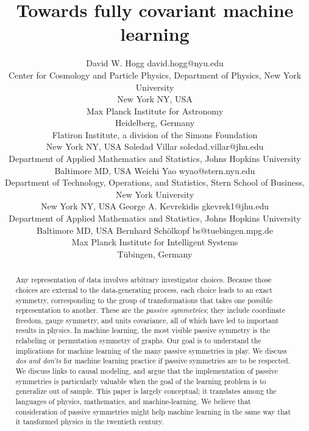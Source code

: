 \documentclass[preprint]{article} %
\title{Towards fully covariant machine learning}
\author{\name David W. Hogg \email david.hogg@nyu.edu\\
      \addr Center for Cosmology and Particle Physics, Department of Physics, New York University\\
            New York NY, USA\\[1ex]
            Max Planck Institute for Astronomy\\
            Heidelberg, Germany\\[1ex]
            Flatiron Institute, a division of the Simons Foundation\\
            New York NY, USA
      \AND
      \name Soledad Villar \email soledad.villar@jhu.edu\\
      \addr Department of Applied Mathematics and Statistics, Johns Hopkins University\\
            Baltimore MD, USA
      \AND
      \name Weichi Yao \email wyao@stern.nyu.edu\\
      \addr Department of Technology, Operations, and Statistics, Stern School of Business, New York University\\
            New York NY, USA
      \AND
      \name George A. Kevrekidis \email gkevrek1@jhu.edu\\
      \addr Department of Applied Mathematics and Statistics, Johns Hopkins University\\
            Baltimore MD, USA
      \AND
      \name Bernhard Sch\"olkopf \email bs@tuebingen.mpg.de\\
      \addr Max Planck Institute for Intelligent Systems\\ 
            T\"ubingen, Germany
     }
\begin{document}
\maketitle\thispagestyle{plain}

\begin{abstract}
Any representation of data involves arbitrary investigator choices.
Because those choices are external to the data-generating process, each choice leads to an exact symmetry, corresponding to the group of transformations that takes one possible representation to another.
These are the \emph{passive symmetries}; they include coordinate freedom, gauge symmetry, and units covariance, all of which have led to important results in physics.
In machine learning, the most visible passive symmetry is the relabeling or permutation symmetry of graphs.
Our goal is to understand the implications for machine learning of the many passive symmetries in play.
We discuss \emph{dos and don'ts} for machine learning practice if passive symmetries are to be respected.
We discuss links to causal modeling, and argue that the implementation of passive symmetries is particularly valuable when the goal of the learning problem is to generalize out of sample.
This paper is largely conceptual;
it translates among the languages of physics, mathematics, and machine-learning.
We believe that consideration of passive symmetries might help machine learning in the same way that it tansformed physics in the twentieth century.
\end{abstract}
\end{document}
